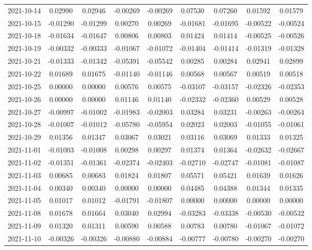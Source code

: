 {\begin{footnotesize}
\begin{longtable}{lcccccccc}
2021-10-14 & 0.02990 & 0.02946 & -0.00269 & -0.00269 & 0.07530 & 0.07260 & 0.01592 & 0.01579 \\
2021-10-15 & -0.01290 & -0.01299 & 0.00270 & 0.00269 & -0.01681 & -0.01695 & -0.00522 & -0.00524 \\
2021-10-18 & -0.01634 & -0.01647 & 0.00806 & 0.00803 & 0.01424 & 0.01414 & -0.00525 & -0.00526 \\
2021-10-19 & -0.00332 & -0.00333 & -0.01067 & -0.01072 & -0.01404 & -0.01414 & -0.01319 & -0.01328 \\
2021-10-21 & -0.01333 & -0.01342 & -0.05391 & -0.05542 & 0.00285 & 0.00284 & 0.02941 & 0.02899 \\
2021-10-22 & 0.01689 & 0.01675 & -0.01140 & -0.01146 & 0.00568 & 0.00567 & 0.00519 & 0.00518 \\
2021-10-25 & 0.00000 & 0.00000 & 0.00576 & 0.00575 & -0.03107 & -0.03157 & -0.02326 & -0.02353 \\
2021-10-26 & 0.00000 & 0.00000 & 0.01146 & 0.01140 & -0.02332 & -0.02360 & 0.00529 & 0.00528 \\
2021-10-27 & -0.00997 & -0.01002 & -0.01983 & -0.02003 & 0.03284 & 0.03231 & -0.00263 & -0.00264 \\
2021-10-28 & -0.01007 & -0.01012 & -0.05780 & -0.05954 & 0.02023 & 0.02003 & -0.01055 & -0.01061 \\
2021-10-29 & 0.01356 & 0.01347 & 0.03067 & 0.03021 & 0.03116 & 0.03069 & 0.01333 & 0.01325 \\
2021-11-01 & -0.01003 & -0.01008 & 0.00298 & 0.00297 & 0.01374 & 0.01364 & -0.02632 & -0.02667 \\
2021-11-02 & -0.01351 & -0.01361 & -0.02374 & -0.02403 & -0.02710 & -0.02747 & -0.01081 & -0.01087 \\
2021-11-03 & 0.00685 & 0.00683 & 0.01824 & 0.01807 & 0.05571 & 0.05421 & 0.01639 & 0.01626 \\
2021-11-04 & 0.00340 & 0.00340 & 0.00000 & 0.00000 & 0.04485 & 0.04388 & 0.01344 & 0.01335 \\
2021-11-05 & 0.01017 & 0.01012 & -0.01791 & -0.01807 & 0.00000 & 0.00000 & 0.00000 & 0.00000 \\
2021-11-08 & 0.01678 & 0.01664 & 0.03040 & 0.02994 & -0.03283 & -0.03338 & -0.00530 & -0.00532 \\
2021-11-09 & 0.01320 & 0.01311 & 0.00590 & 0.00588 & 0.00783 & 0.00780 & -0.01067 & -0.01072 \\
2021-11-10 & -0.00326 & -0.00326 & -0.00880 & -0.00884 & -0.00777 & -0.00780 & -0.00270 & -0.00270 \\

\end{longtable}
\end{footnotesize}}
